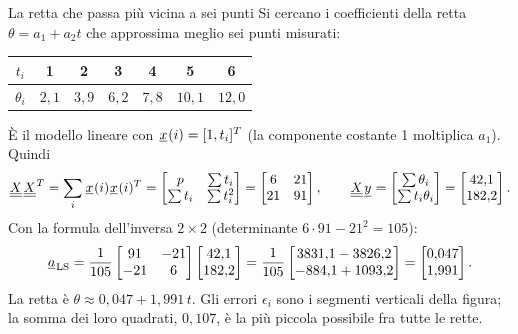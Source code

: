 \begin{esempio}{La retta che passa più vicina a sei punti}
Si cercano i coefficienti della retta $\theta = a_1 + a_2 t$ che approssima meglio sei punti misurati:
\begin{center}
\renewcommand{\arraystretch}{1.25}
\begin{tabular}{@{}c|cccccc@{}}
  $t_i$ & 1 & 2 & 3 & 4 & 5 & 6 \\ \hline
  $\theta_i$ & $2{,}1$ & $3{,}9$ & $6{,}2$ & $7{,}8$ & $10{,}1$ & $12{,}0$
\end{tabular}
\end{center}
È il modello lineare con ${\mkern1mu\underline{x}\mkern1mu}(i) = [1, t_i]^T$ (la componente costante 1 moltiplica $a_1$). Quindi
\[ {\mkern1mu\underline{\underline{X}}\mkern1mu}{\mkern1mu\underline{\underline{X}}\mkern1mu}^T = \sum_i {\mkern1mu\underline{x}\mkern1mu}(i) {\mkern1mu\underline{x}\mkern1mu}(i)^T = \begin{bmatrix} p & \sum t_i \\ \sum t_i & \sum t_i^2
   \end{bmatrix} = \begin{bmatrix} 6 & 21 \\ 21 & 91 \end{bmatrix} , \qquad {\mkern1mu\underline{\underline{X}}\mkern1mu}{\mkern1mu\underline{y}\mkern1mu} = \begin{bmatrix} \sum
   \theta_i \\ \sum t_i \theta_i \end{bmatrix} = \begin{bmatrix} 42{,}1 \\ 182{,}2 \end{bmatrix} . \]
Con la formula dell'inversa $2 \times 2$ (determinante $6 \cdot 91 - 21^2 = 105$):
\[ {\mkern1mu\underline{a}\mkern1mu}_{\text{LS}} = \frac{1}{105} \begin{bmatrix} 91 & -21 \\ -21 & 6 \end{bmatrix} \begin{bmatrix} 42{,}1 \\
   182{,}2 \end{bmatrix} = \frac{1}{105} \begin{bmatrix} 3831{,}1 - 3826{,}2 \\ -884{,}1 + 1093{,}2 \end{bmatrix} =
   \begin{bmatrix} 0{,}047 \\ 1{,}991 \end{bmatrix} . \]
La retta è $\theta \approx 0{,}047 + 1{,}991\, t$. Gli errori $\epsilon_i$ sono i segmenti verticali della figura; la
somma dei loro quadrati, $0{,}107$, è la più piccola possibile fra tutte le rette.
\begin{center}

\end{center}
\end{esempio}
